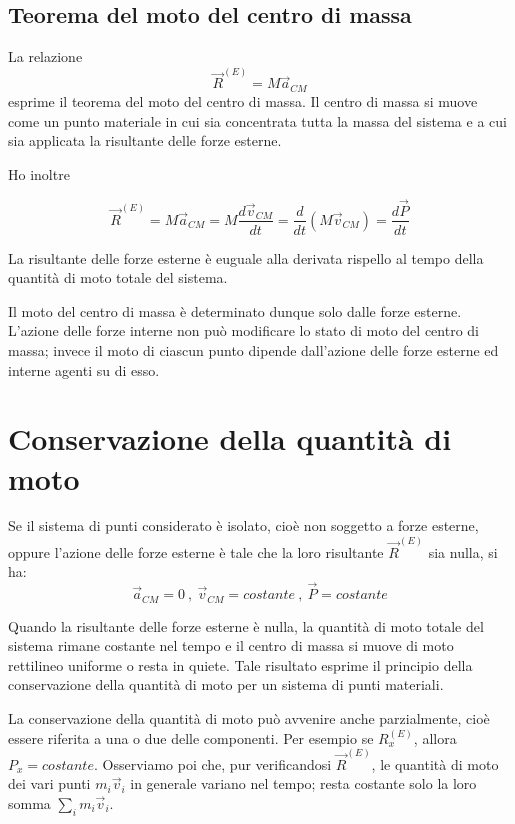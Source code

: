 \documentclass[class=book, crop=false, oneside, 12pt]{standalone}
\begin{document}
\subsection{Teorema del moto del centro di massa}

La relazione
\begin{equation}
    \overrightarrow{R}^{(E)} = M \overrightarrow{a}_{C M}
\end{equation}
esprime il teorema del moto del centro di massa. 
Il centro di massa si muove come un punto materiale in cui sia concentrata tutta la massa del sistema e a cui sia applicata la risultante delle forze esterne.

Ho inoltre

\begin{equation}
    \overrightarrow{R}^{(E)} = M \overrightarrow{a}_{C M} = M \frac{d \overrightarrow{v}_{C M}}{dt} = \frac{d}{dt} \left( M \overrightarrow{v}_{C M}\right) = \frac{d \overrightarrow{P}}{dt}
\end{equation}

La risultante delle forze esterne è euguale alla derivata rispello al tempo della quantità di moto totale del sistema. 

Il moto del centro di massa è determinato dunque solo dalle forze esterne. 
L'azione delle forze interne non può modificare lo stato di moto del centro di massa; invece il moto di ciascun punto dipende dall'azione delle forze esterne ed interne agenti su di esso.

\section{Conservazione della quantità di moto}

Se il sistema di punti considerato è isolato, cioè non soggetto a forze esterne, oppure l'azione delle forze esterne è tale che la loro risultante \(\overrightarrow{R}^{(E)}\) sia nulla, si ha:
\begin{equation}
    \overrightarrow{a}_{CM} = 0 \ , \ \overrightarrow{v}_{CM} = costante \ , \ \overrightarrow{P} = costante
\end{equation}

Quando la risultante delle forze esterne è nulla, la quantità di moto totale del sistema rimane costante nel tempo e il centro di massa si muove di moto rettilineo uniforme o resta in quiete. 
Tale risultato esprime il principio della conservazione della quantità di moto per un sistema di punti materiali. 

La conservazione della quantità di moto può avvenire anche parzialmente, cioè essere riferita a una o due delle componenti. 
Per esempio se \(R_x^{(E)}\), allora \(P_x = costante\). 
Osserviamo poi che, pur verificandosi \(\overrightarrow{R}^{(E)}\), le quantità di moto dei vari punti \(m_i \overrightarrow{v}_i\) in generale variano nel tempo; resta costante solo la loro somma \(\sum_i m_i \overrightarrow{v}_i\).
\end{document}
